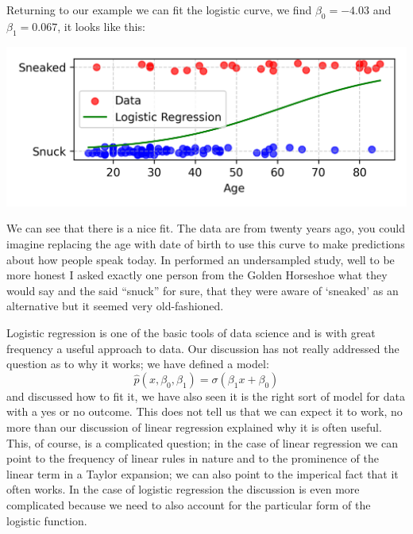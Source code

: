\documentclass[12pt]{article}
\begin{document}
Returning to our example we can fit the logistic curve, we find $\beta_0=-4.03$ and $\beta_1= 0.067$, it looks like this:
\begin{center}
  \includegraphics[]{02.4_fit.png}
  \end{center}
We can see that there is a nice fit. The data are from twenty years
ago, you could imagine replacing the age with date of birth to use
this curve to make predictions about how people speak today. In
performed an undersampled study, well to be more honest I asked
exactly one person from the Golden Horseshoe what they would say and
the said ``snuck'' for sure, that they were aware of `sneaked' as an
alternative but it seemed very old-fashioned.

Logistic regression is one of the basic tools of data science and is
with great frequency a useful approach to data. Our discussion has not
really addressed the question as to why it works; we have defined a model:
\begin{equation}
  \hat{p}(x,\beta_0,\beta_1)=\sigma(\beta_1x+\beta_0)
\end{equation}
and discussed how to fit it, we have also seen it is the right sort of
model for data with a yes or no outcome. This does not tell us that we
can expect it to work, no more than our discussion of linear
regression explained why it is often useful. This, of course, is a
complicated question; in the case of linear regression we can point to
the frequency of linear rules in nature and to the prominence of the
linear term in a Taylor expansion; we can also point to the imperical
fact that it often works. In the case of logistic regression the
discussion is even more complicated because we need to also account
for the particular form of the logistic function.
\end{document}
